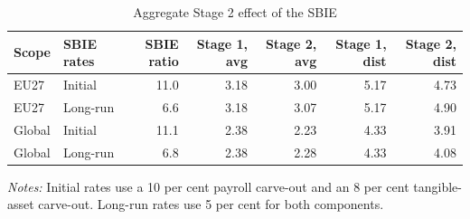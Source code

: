 \begin{table}[H]
\centering
\small
\caption[Aggregate Stage 2 effect of the SBIE]{Aggregate Stage 2 effect of the SBIE}
\label{tab:stage2_aggregate_updated}
\begin{tabular}{@{}llrrrrr@{}}
\toprule
Scope & SBIE rates & SBIE ratio & Stage 1, avg & Stage 2, avg & Stage 1, dist & Stage 2, dist \\
\midrule
EU27 & Initial & 11.0 & 3.18 & 3.00 & 5.17 & 4.73 \\
EU27 & Long-run &  6.6 & 3.18 & 3.07 & 5.17 & 4.90 \\
Global & Initial & 11.1 & 2.38 & 2.23 & 4.33 & 3.91 \\
Global & Long-run &  6.8 & 2.38 & 2.28 & 4.33 & 4.08 \\
\bottomrule
\end{tabular}

\vspace{0.5em}
\begin{minipage}{0.96\textwidth}
\footnotesize\raggedright \textit{Notes:} Initial rates use a 10 per cent payroll carve-out and an 8 per cent tangible-asset carve-out. Long-run rates use 5 per cent for both components.
\end{minipage}
\end{table}
